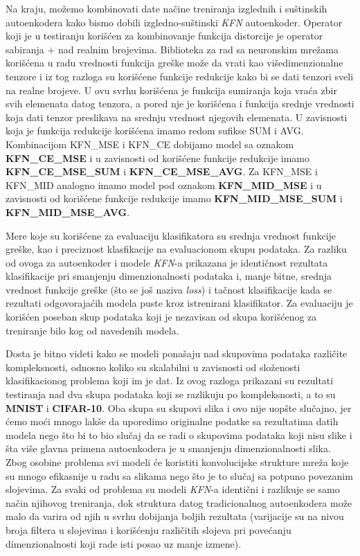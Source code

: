 \documentclass{article}
\begin{document}
	Na kraju, mo\v zemo kombinovati date na\v cine treniranja izglednih i su\v stinskih autoenkodera kako bismo dobili izgledno-su\v stinski \emph{KFN} autoenkoder.
	Operator koji je u testiranju kori\v s\'cen za kombinovanje funkcija distorcije je operator sabiranja $+$ nad realnim brojevima.
	Biblioteka za rad sa neuronskim mre\v zama kori\v s\'cena u radu vrednosti funkcija gre\v ske mo\v ze da vrati kao vi\v sedimenzionalne tenzore i iz tog razloga su kori\v s\'cene funkcije redukcije kako bi se dati tenzori sveli na realne brojeve.
	U ovu svrhu kori\v s\'cena je funkcija sumiranja koja vra\'ca zbir svih elemenata datog tenzora, a pored nje je kori\v s\'cena i funkcija srednje vrednosti koja dati tenzor preslikava na srednju vrednost njegovih elemenata.
	U zavisnosti koja je funkcija redukcije kori\v s\'cena imamo redom sufikse SUM i AVG.
	Kombinacijom KFN\_MSE i KFN\_CE dobijamo model sa oznakom \textbf{KFN\_CE\_MSE} i u zavisnosti od kori\v s\'cene funkcije redukcije imamo \textbf{KFN\_CE\_MSE\_SUM} i \textbf{KFN\_CE\_MSE\_AVG}.
	Za KFN\_MSE i KFN\_MID analogno imamo model pod oznakom \textbf{KFN\_MID\_MSE} i u zavisnosti od kori\v s\'cene funkcije redukcije imamo \textbf{KFN\_MID\_MSE\_SUM} i \textbf{KFN\_MID\_MSE\_AVG}.
	
	Mere koje su kori\v s\'cene za evaluaciju klasifikatora su srednja vrednost funkcije gre\v ske, kao i preciznost klasfikacije na evaluacionom skupu podataka.
	Za razliku od ovoga za autoenkoder i modele \emph{KFN}-a prikazana je identi\v cnost rezultata klasifikacije pri smanjenju dimenzionalnosti podataka i, manje bitne, srednja vrednost funkcije gre\v ske (\v sto se jo\v s naziva \emph{loss}) i ta\v cnost klasifikacije kada se rezultati odgovoraja\'cih modela puste kroz istrenirani klasifikator.
	Za evaluaciju je kori\v s\'cen poseban skup podataka koji je nezavisan od skupa kori\v s\'cenog za treniranje bilo kog od navedenih modela.
	
	Dosta je bitno videti kako se modeli pona\v saju nad skupovima podataka razli\v cite kompleksnosti, odnosno koliko su skalabilni u zavisnosti od slo\v zenosti klasifikacionog problema koji im je dat.
	Iz ovog razloga prikazani su rezultati testiranja nad dva skupa podataka koji se razlikuju po kompleksnosti, a to su \textbf{MNIST} i \textbf{CIFAR-10}.
	Oba skupa su skupovi slika i ovo nije uop\v ste slu\v cajno, jer \'cemo mo\'ci mnogo lak\v se da uporedimo originalne podatke sa rezultatima datih modela nego \v sto bi to bio slu\v caj da se radi o skupovima podataka koji nisu slike i \v sta vi\v se glavna primena autoenkodera je u smanjenju dimenzionalnosti slika.
	Zbog osobine problema svi modeli \'ce koristiti konvolucijske strukture mre\v za koje su mnogo efikasnije u radu sa slikama nego \v sto je to slu\v caj sa potpuno povezanim slojevima.
	Za svaki od problema su modeli \emph{KFN}-a identi\v cni  i razlikuje se samo na\v cin njihovog treniranja, dok struktura datog tradicionalnog autoenkodera mo\v ze malo da varira od njih u svrhu dobijanja boljih rezultata (varijacije su na nivou broja filtera u slojevima i kori\v s\'cenju razli\v citih slojeva pri pove\'canju dimenzionalnosti koji rade isti posao uz manje izmene).
	
\end{document}
